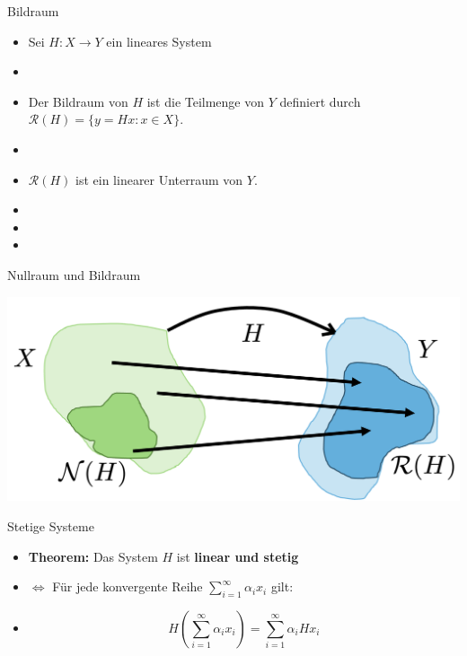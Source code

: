 \documentclass[14pt, aspectratio=169, handout]{beamer}
\begin{document}
\begin{frame}{Bildraum}
    \begin{itemize}
        \item Sei $H:X \to Y$ ein lineares System
        \item[] 
        \item[] Der Bildraum von $H$ ist die Teilmenge von $Y$ definiert durch $\mathcal{R}(H) = \{y =Hx : x \in X\}$.
        \item[] 
        \item[] $\mathcal{R}(H)$ ist ein linearer Unterraum von $Y$.
        \item[] 
        \item[] 
        \item[] 
    \end{itemize}
\end{frame}

\begin{frame}{Nullraum und Bildraum}
    \begin{center}
        \includegraphics[width=0.9\linewidth]{figures/Bildraum_Nullraum.png}
    \end{center}
\end{frame}

\begin{frame}{Stetige Systeme}
    \begin{itemize}
        \item \textbf{Theorem:} Das System $H$ ist \textbf{linear und stetig}
        \item[] \hspace{64pt}  $\Leftrightarrow$ Für jede konvergente Reihe $\sum_{i=1}^\infty \alpha_i x_i$ gilt:
        \item[] 
    $$H\left( \sum_{i=1}^\infty \alpha_i x_i \right) = \sum_{i=1}^\infty \alpha_i H x_i$$
    \end{itemize}
\end{frame}
\end{document}
